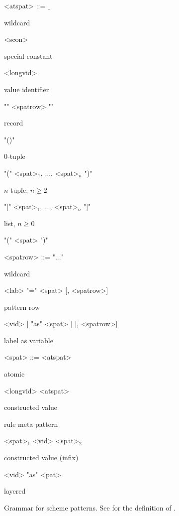 \begin{nonfloatingtable}

\setlength{\grammarindent}{7em}

\newcommand{\cmt}[1]{\parbox{8em}{\small{#1}}}

\begin{grammar}
  <atspat> ::= $\_$                              \hfill \cmt{wildcard}
  \alt <scon>                                    \hfill \cmt{special constant}
  \alt ["op"] <longvid>                          \hfill \cmt{value identifier}
  \alt "{" <spatrow> "}"                         \hfill \cmt{record}
  \alt "()"                                      \hfill \cmt{$0$-tuple}
  \alt "(" <spat>$_1$, $\ldots$, <spat>$_n$ ")"  \hfill \cmt{$n$-tuple, $n \geq  2$}
  \alt "[" <spat>$_1$, $\ldots$, <spat>$_n$ "]"  \hfill \cmt{list, $n \geq 0$}
  \alt "(" <spat> ")" 

  <spatrow> ::= "..."                      \hfill \cmt{wildcard}
  \alt <lab> "=" <spat> [, <spatrow>]      \hfill \cmt{pattern row}
  \alt <vid> [ "as" <spat> ] [, <spatrow>] \hfill \cmt{label as variable}

  <spat> ::= <atspat>                      \hfill \cmt{atomic}
  \alt ["op"] <longvid> <atspat>           \hfill \cmt{constructed value}
                   \hfill \cmt{rule meta pattern}
  \alt <spat>$_1$ <vid> <spat>$_2$         \hfill \cmt{constructed value (infix)}
  \alt ["op"] <vid> "as" <pat>             \hfill \cmt{layered}
\end{grammar}
  
  \caption{Grammar for scheme patterns. See  for
    the definition of .}
  \label{tab:scheme-patterns}
\end{nonfloatingtable}


